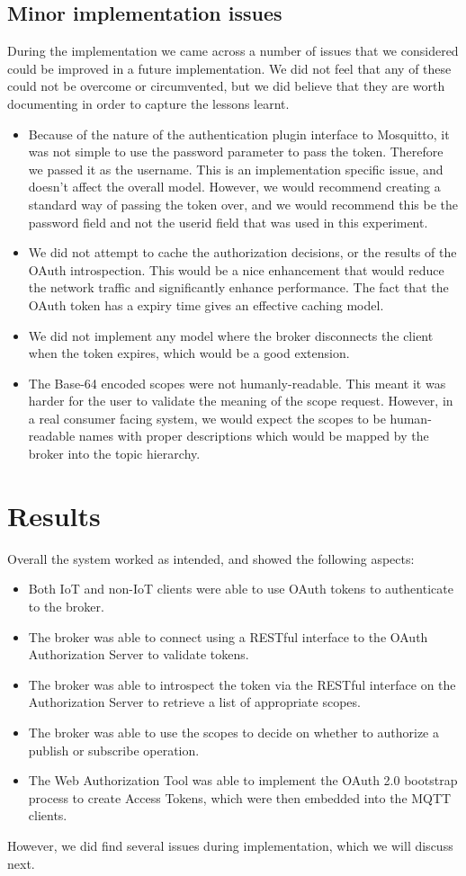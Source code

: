 \documentclass{IEEEtran}
\begin{document}
\subsection{Minor implementation issues} 
During the implementation we came across a number of issues that we considered could be improved 
in a future implementation. We did not feel that any of these could not be overcome or 
circumvented, but we did believe that they are worth documenting in order to capture the lessons learnt.
\begin{itemize}
\item Because of the nature of the authentication plugin interface to Mosquitto, it was not simple 
to use the password parameter to pass the token. Therefore we passed it as the username. 
This is an implementation specific issue, and doesn't affect the overall model. However, we would recommend creating a standard
way of passing the token over, and we would recommend this be the password field and not the userid field that was used in this experiment.
\item We did not attempt to cache the authorization decisions, or the results of the OAuth introspection.
This would be a nice enhancement that would reduce the network traffic and significantly enhance performance. 
The fact that the OAuth token has a expiry time gives an effective caching model.
\item We did not implement any model where the broker disconnects the client when the token expires, which 
would be a good extension.
\item The Base-64 encoded scopes were not humanly-readable. This meant it was harder for the user to validate the meaning of the scope request. However, in a real 
consumer facing system, we would expect the scopes to be human-readable names with proper descriptions which would be mapped by the broker into the topic hierarchy.
\end{itemize}
\fi

\section{Results}\label{sect:results}
Overall the system worked as intended, and showed the following aspects:
\begin{itemize}
\item Both IoT and non-IoT clients were able to use OAuth tokens to authenticate to the broker.
\item The broker was able to connect using a RESTful interface to the OAuth Authorization Server 
to validate tokens.
\item The broker was able to introspect the token via the RESTful interface on the Authorization Server
to retrieve a list of appropriate scopes.
\item The broker was able to use the scopes to decide on whether to authorize a publish or 
subscribe operation.
\item The Web Authorization Tool was able to implement the OAuth 2.0 bootstrap process to create Access
Tokens, which were then embedded into the MQTT clients.
\end{itemize}
However, we did find several issues during implementation, which we will discuss next.
\end{document}

